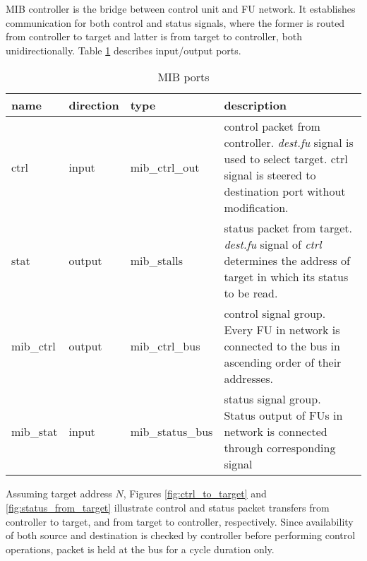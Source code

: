 	MIB controller is the bridge between control unit and FU network. It establishes communication for both control and status signals, where the former is routed from controller to target and latter is from target to controller, both unidirectionally. Table \ref{table:mib_description} describes input/output ports.  
	
	
	
	\begin{table}[!htbp]
		\begin{tabular}{| l| l | l | p{9cm} |}
			\hline
			\textbf{name} & \textbf{direction} & \textbf{type} &  \textbf{description}\\ \hline
			ctrl & input & mib\_ctrl\_out & control packet from controller. \emph{dest.fu} signal is used to select target. ctrl signal is steered to destination port without modification. \\ \hline
			stat & output & mib\_stalls & status packet from target. \emph{dest.fu} signal of \emph{ctrl} determines the address of target in which its status to be read.  \\ \hline
			mib\_ctrl & output & mib\_ctrl\_bus & control signal group. Every FU in network is connected to the bus in ascending order of their addresses.   \\ \hline
			mib\_stat & input & mib\_status\_bus & status signal group. Status output of FUs in network is connected through corresponding signal   \\ \hline
			
		\end{tabular}
		
		\caption{MIB ports \label{table:mib_description}}
		\centering
	\end{table}
	 
	
	Assuming target address $N$, Figures \ref{fig:ctrl_to_target} and \ref{fig:status_from_target} illustrate control and status packet transfers from controller to target, and from target to controller, respectively. Since availability of both source and destination is checked by controller before performing control operations, packet is held at the bus for a cycle duration only. 
	
